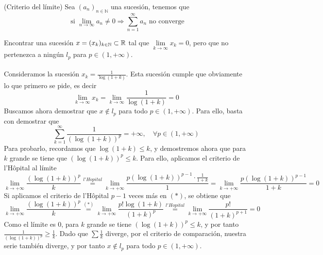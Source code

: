 \begin{prop}(Criterio del límite)
    Sea $(a_n)_{n \in \mathbb{N}}$ una sucesión, tenemos que
    \begin{equation*}
        \text{ si } \lim_{n \to \infty} a_n \neq 0 \Longrightarrow \sum_{n=1}^\infty a_n \text{ no converge}
    \end{equation*}
\end{prop}

\begin{ejercicio}
    Encontrar una sucesión $x=(x_k)_{k\in\mathbb{N}} \subset \mathbb{R}$ tal que $\lim\limits_{k \to \infty} x_k = 0$, pero que no pertenezca a ningún $l_p$ para $p \in (1, +\infty)$. \\ \\
    \noindent
    Consideramos la sucesión $x_k = \frac{1}{\log(1+k)}$. Esta sucesión cumple que obviamente lo que primero se pide, es decir
    \begin{equation*}
        \lim_{k \to \infty} x_k = \lim_{k \to \infty} \frac{1}{\log(1+k)} = 0
    \end{equation*}
    Buscamos ahora demostrar que $x\notin l_p$ para todo $p \in (1, +\infty)$. Para ello, basta con demostrar que 
    $$\sum_{k=1}^{\infty} \frac{1}{(\log(1+k))^p} = +\infty, \quad \forall p \in (1, +\infty)$$ 
    Para probarlo, recordamos que $\log(1+k) \leq k$, y demostremos ahora que para $k$ grande se tiene que $(\log(1+k))^p \leq k$. Para ello, aplicamos el criterio de l'Hôpital al límite
    \begin{equation*}
        \lim_{k \to +\infty} \frac{(\log(1+k))^p}{k} \stackrel{l'Hopital}{=} \lim_{k \to +\infty} \frac{p (\log(1+k))^{p-1} \cdot \frac{1}{1+k}}{1} = \lim_{k \to +\infty} \frac{p (\log(1+k))^{p-1}}{1+k} = 0
    \end{equation*}
    Si aplicamos el criterio de l'Hôpital $p-1$ veces más en $(*)$, se obtiene que 
    \begin{equation*}
        \lim_{k \to +\infty} \frac{(\log(1+k))^p}{k} \stackrel{(*)}{=} \lim_{k \to +\infty} \frac{p! \log(1+k)}{(1+k)^p} \stackrel{l'Hopital}{=} \lim_{k \to +\infty} \frac{p!}{(1+k)^{p+1}} = 0
    \end{equation*}
    Como el límite es 0, para $k$ grande se tiene $(\log(1+k))^p \leq k$, y por tanto $\frac{1}{(\log(1+k))^p} \geq \frac{1}{k}$. Dado que $\sum \frac{1}{k}$ diverge, por el criterio de comparación, nuestra serie también diverge, y por tanto $x \notin l_p$ para todo $p \in (1, +\infty)$.
\end{ejercicio}

